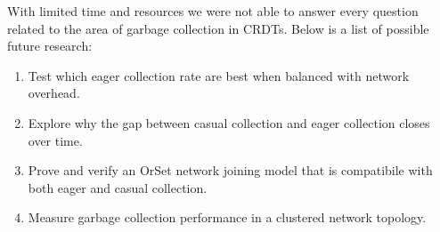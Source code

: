 \documentclass{article}
\begin{document}
\begin{multicols}{2}
\begin{refsection}
With limited time and resources we were not able to answer every
question related to the area of garbage collection in CRDTs. Below is a
list of possible future research:

\begin{enumerate}
    \item Test which eager collection rate are best when
        balanced with network overhead.
    \bigskip
    \item Explore why the gap between casual collection and eager
        collection closes over time.
    \bigskip
    \item Prove and verify an OrSet network joining model that
        is compatibile with both eager and casual collection.
    \bigskip
    \item Measure garbage collection performance in a clustered
        network topology.
\end{enumerate}

\printbibliography[title=References]

\end{refsection}

\end{multicols}
\end{document}
